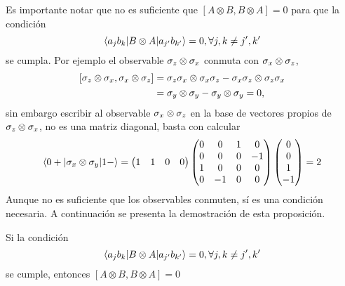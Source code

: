 Es importante notar que no es suficiente que  $[A\otimes B,B \otimes A]=0$ para que la condición \[\langle a_j b_k|B\otimes A|a_{j'}b_{k'}\rangle=0, \forall j,k\ne j',k'\] se cumpla. Por ejemplo el observable $\sigma_z\otimes \sigma_x$ conmuta con $\sigma_x \otimes \sigma_z$,\[\begin{split}[\sigma_z\otimes \sigma_x,\sigma_x \otimes \sigma_z]&=\sigma_z \sigma_x \otimes \sigma_x \sigma_z- \sigma_x\sigma_z \otimes \sigma_z\sigma_x\\
&=\sigma_y\otimes \sigma_y -\sigma_y\otimes \sigma_y =0,
\end{split}\]sin embargo escribir al observable $\sigma_x\otimes \sigma_z $ en la base de vectores propios de $\sigma_z\otimes \sigma_x$, no es una matriz diagonal, basta con calcular \[\begin{split}
    \langle 0+|\sigma_x\otimes \sigma_y|1-\rangle&=\begin{pmatrix}
        1&1&0&0
    \end{pmatrix}\begin{pmatrix}
        0&0&1&0\\
        0&0&0&-1\\
        1&0&0&0\\
        0&-1&0&0\\
    \end{pmatrix}\begin{pmatrix}
        0\\
        0\\
        1\\
        -1\\
    \end{pmatrix}=2\\
\end{split}\]Aunque no es suficiente que los observables conmuten, sí es una condición necesaria. A continuación se presenta la demostración de esta proposición.\begin{proposition}
    Si la condición \[\langle a_j b_k|B\otimes A|a_{j'}b_{k'}\rangle=0, \forall j,k\ne j',k'\] se cumple, entonces $[A\otimes B,B \otimes A]=0$  
\end{proposition}


